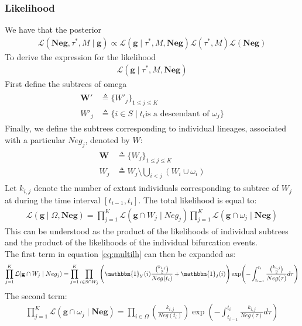 \documentclass{report}
\theoremstyle{definition}
\begin{document}
\subsubsection{Likelihood}
We have that the posterior
\begin{gather}
\mathcal{L}(\mathbf{Neg}, \tau^*, M\mid\mathbf{g}) \propto 
\mathcal{L}(\mathbf{g}\mid \tau^*, M, \mathbf{Neg})\mathcal{L}(\tau^*,M)\mathcal{L}(\mathbf{Neg})
\end{gather}
To derive the expression for the likelihood 
\begin{gather*}
\mathcal{L}(\mathbf{g}\mid \tau^*, M, \mathbf{Neg})
\end{gather*}
First define the subtrees of omega
\begin{gather}
\begin{aligned}
\mathbf{W}' &\triangleq \{W'_j\}_{1\leq j\leq K}\\
W'_j &\triangleq \{i\in S\mid t_i \text{is a descendant of } \omega_j\}
\end{aligned}
\end{gather} 
Finally, we define the subtrees corresponding to individual lineages, associated with a particular $Neg_j$, denoted by $W$:
\begin{gather}
\begin{aligned}
\mathbf{W} &\triangleq \{W_j\}_{1\leq j\leq K}\\
W_j &\triangleq W_j \setminus \bigcup_{i<j}(W_i\cup\omega_i)
\end{aligned}
\end{gather} 
Let $k_{i,j}$ denote the number of extant individuals corresponding to subtree of $W_j$ at during the time interval $[t_{i-1}, t_i]$.
The total likelihood is equal to:
\begin{gather}\label{eq:multilh}
\mathcal{L}(\mathbf{g}\mid \Omega, \mathbf{Neg}) = \prod_{j=1}^{K}\mathcal{L}(\mathbf{g}\cap W_j \mid Neg_j)\prod_{j=1}^{K}\mathcal{L}(\mathbf{g}\cap \omega_j \mid \mathbf{Neg})
\end{gather}
This can be understood as the product of the likelihoods of individual subtrees and the product of the likelihoods of the individual bifurcation events.\\
The first term in equation \ref{eq:multilh} can then be expanded as:
\begin{gather}
\prod_{j=1}^{K}\mathcal{L}(\mathbf{g}\cap W_j \mid Neg_j) 
= \prod_{j=1}^{K}\prod_{i\in S\cap W_j}\left(\mathbbm{1}_Y(i)\frac{\binom{k_{i,j}}{2}}{Neg(t_i)}+\mathbbm{1}_I(i)\right)
\exp(-\int_{t_{i-1}}^{t_i}\frac{\binom{k_{i,j}}{2}}{Neg(\tau)}d\tau)
\end{gather}
The second term:
\begin{gather}
\prod_{j=1}^{K}\mathcal{L}(\mathbf{g}\cap \omega_j \mid \mathbf{Neg})
= \prod_{i\in\Omega}\left(\frac{k_{i,j}}{Neg(t_i)}\right)
\exp(-\int_{t_{i-1}}^{t_i}\frac{k_{i,j}}{Neg(\tau)}d\tau)
\end{gather}
\end{document}
